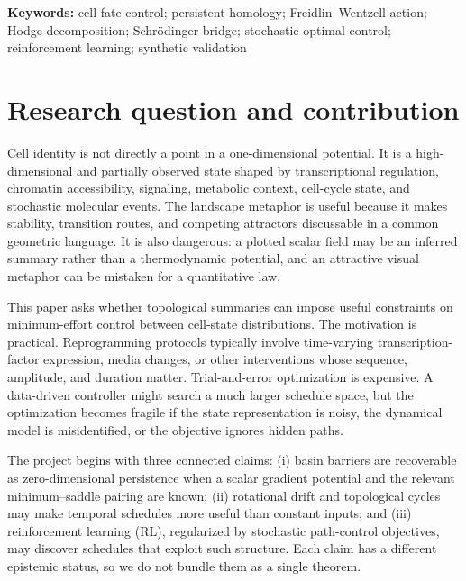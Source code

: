 \documentclass[11pt]{article}
\newcommand{\1}{\mathbf{1}}
\begin{document}
\begin{titlepage}
\par\vspace{0.05in}
\noindent\textbf{Keywords:} cell-fate control; persistent homology; Freidlin--Wentzell action; Hodge decomposition; Schrödinger bridge; stochastic optimal control; reinforcement learning; synthetic validation
\par\vspace{0.04in}\endgroup
\end{titlepage}
\setcounter{tocdepth}{1}
\tableofcontents
\clearpage
{}

\section{Research question and contribution}
Cell identity is not directly a point in a one-dimensional potential. It is a high-dimensional and partially observed state shaped by transcriptional regulation, chromatin accessibility, signaling, metabolic context, cell-cycle state, and stochastic molecular events. The landscape metaphor is useful because it makes stability, transition routes, and competing attractors discussable in a common geometric language. It is also dangerous: a plotted scalar field may be an inferred summary rather than a thermodynamic potential, and an attractive visual metaphor can be mistaken for a quantitative law.

This paper asks whether topological summaries can impose useful constraints on minimum-effort control between cell-state distributions. The motivation is practical. Reprogramming protocols typically involve time-varying transcription-factor expression, media changes, or other interventions whose sequence, amplitude, and duration matter. Trial-and-error optimization is expensive. A data-driven controller might search a much larger schedule space, but the optimization becomes fragile if the state representation is noisy, the dynamical model is misidentified, or the objective ignores hidden paths.

The project begins with three connected claims: (i) basin barriers are recoverable as zero-dimensional persistence when a scalar gradient potential and the relevant minimum--saddle pairing are known; (ii) rotational drift and topological cycles may make temporal schedules more useful than constant inputs; and (iii) reinforcement learning (RL), regularized by stochastic path-control objectives, may discover schedules that exploit such structure. Each claim has a different epistemic status, so we do not bundle them as a single theorem.
\end{document}
